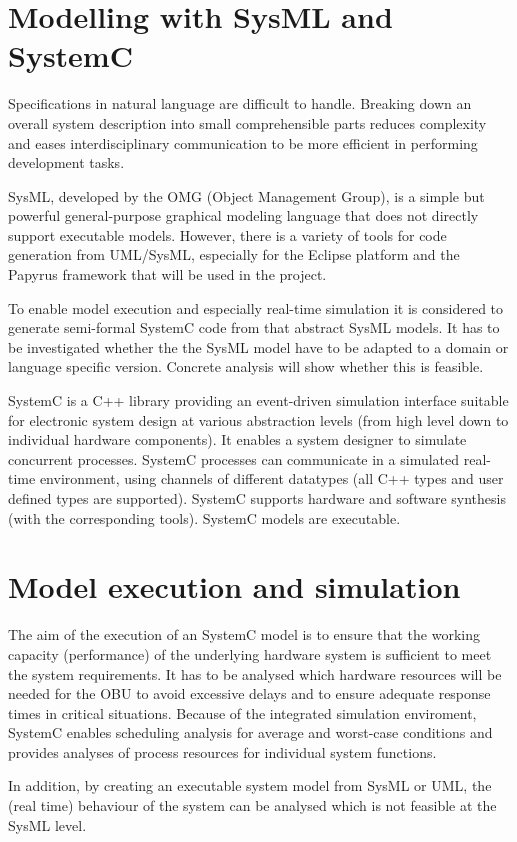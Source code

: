 \section{Modelling with SysML and SystemC}

Specifications in natural language are difficult to handle. Breaking
down an overall system description into small comprehensible parts
reduces complexity and eases interdisciplinary communication to be
more efficient in performing development tasks.

SysML, developed by the OMG (Object Management Group), is a simple but
powerful general-purpose graphical modeling language that does not
directly support executable models. However, there is a variety of
tools for code generation from UML/SysML, especially for the Eclipse
platform and the Papyrus framework that will be used in the project.

To enable model execution and especially real-time simulation it is
considered to generate semi-formal SystemC code from that abstract
SysML models. It has to be investigated whether the the SysML model
have to be adapted to a domain or language specific version. Concrete
analysis will show whether this is feasible.

SystemC is a C++ library providing an event-driven simulation
interface suitable for electronic system design at various abstraction
levels (from high level down to individual hardware components). It
enables a system designer to simulate concurrent processes. SystemC
processes can communicate in a simulated real-time environment, using
channels of different datatypes (all C++ types and user defined types
are supported). SystemC supports hardware and software synthesis (with
the corresponding tools). SystemC models are executable.

\section{Model execution and simulation}

The aim of the execution of an SystemC model is to ensure that the
working capacity (performance) of the underlying hardware system is
sufficient to meet the system requirements. It has to be analysed
which hardware resources will be needed for the OBU to avoid excessive
delays and to ensure adequate response times in critical situations.
Because of the integrated simulation enviroment, SystemC enables
scheduling analysis for average and worst-case conditions and provides
analyses of process resources for individual system functions.

In addition, by creating an executable system model from SysML or UML,
the (real time) behaviour of the system can be analysed which is not
feasible at the SysML level.



